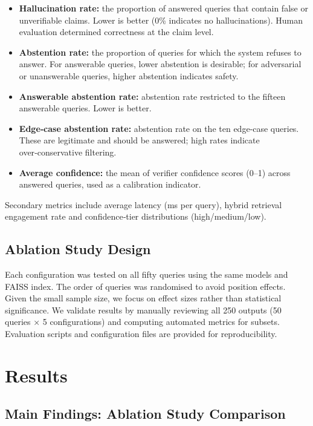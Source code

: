\documentclass{article}
\begin{document}
\begin{itemize}
    \item \textbf{Hallucination rate:} the proportion of answered queries that contain false or unverifiable claims. Lower is better (0\% indicates no hallucinations). Human evaluation determined correctness at the claim level.
    \item \textbf{Abstention rate:} the proportion of queries for which the system refuses to answer. For answerable queries, lower abstention is desirable; for adversarial or unanswerable queries, higher abstention indicates safety.
    \item \textbf{Answerable abstention rate:} abstention rate restricted to the fifteen answerable queries. Lower is better.
    \item \textbf{Edge‑case abstention rate:} abstention rate on the ten edge‑case queries. These are legitimate and should be answered; high rates indicate over‑conservative filtering.
    \item \textbf{Average confidence:} the mean of verifier confidence scores (0–1) across answered queries, used as a calibration indicator.
\end{itemize}

Secondary metrics include average latency (ms per query), hybrid retrieval engagement rate and confidence‑tier distributions (high/medium/low).

\subsection{Ablation Study Design}

Each configuration was tested on all fifty queries using the same models and FAISS index. The order of queries was randomised to avoid position effects. Given the small sample size, we focus on effect sizes rather than statistical significance. We validate results by manually reviewing all 250 outputs (50 queries × 5 configurations) and computing automated metrics for subsets. Evaluation scripts and configuration files are provided for reproducibility.

\section{Results}
\label{sec:results}

\subsection{Main Findings: Ablation Study Comparison}
\end{document}
